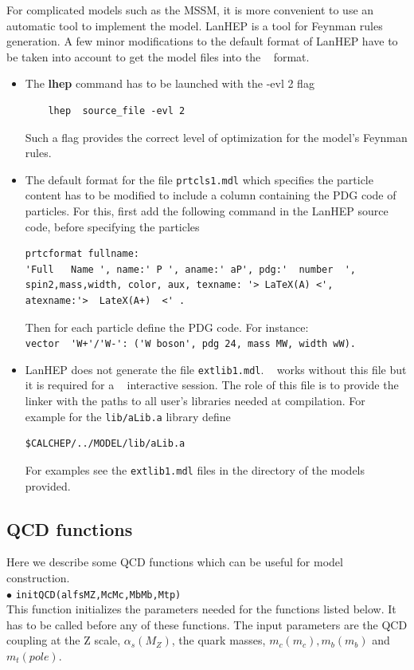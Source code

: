 \documentclass[12pt,a4paper]{article}
\begin{document}
For complicated models such as  the MSSM, it is more convenient to use an automatic tool to implement 
the model.  LanHEP is a  tool for Feynman  rules  generation. A few minor
modifications to the default format of LanHEP have to be taken into account to get the model files into
the \micro~ format. 
\begin{itemize}
\item  The {\bf lhep}  command has to be launched with the {-evl 2} flag  
\begin{verbatim}
    lhep  source_file -evl 2
\end{verbatim}
Such a flag provides the correct level of optimization for  the model's Feynman rules.

\item The default format for the file \verb|prtcls1.mdl| which specifies the particle content has to be
modified to include a column containing the PDG code of particles. 
For this, first add the following command in the LanHEP source code, before specifying the particles  
\begin{verbatim}
prtcformat fullname:
'Full   Name ', name:' P ', aname:' aP', pdg:'  number  ',
spin2,mass,width, color, aux, texname: '> LaTeX(A) <',
atexname:'>  LateX(A+)  <' .
\end{verbatim}

Then for each particle  define the PDG code. For
instance:\\
\verb|vector  'W+'/'W-': ('W boson', pdg 24, mass MW, width wW).|\\




\item LanHEP does not generate the  file \verb|extlib1.mdl|.
\micro~ works without  this file but it is required for a \calchep~ interactive session. 
The role of this file is to provide the linker with the paths to all user's libraries
needed at compilation. For example for the \verb|lib/aLib.a| library define
\begin{verbatim}
$CALCHEP/../MODEL/lib/aLib.a
\end{verbatim}
For  examples see the \verb|extlib1.mdl| files in the  directory of the models provided.  

\end{itemize}

\subsection{QCD functions}
Here we describe some QCD functions which can be useful for 
model construction.\\
\noindent$\bullet$ \verb|initQCD(alfsMZ,McMc,MbMb,Mtp)|\\
This function initializes the parameters needed for the functions
listed below. It has to be called before any of these functions.
The input parameters are the QCD coupling at the Z scale,
$\alpha_s(M_Z)$, the quark masses, $m_c(m_c), m_b(m_b)$ and
$m_t(pole)$.
\end{document}
